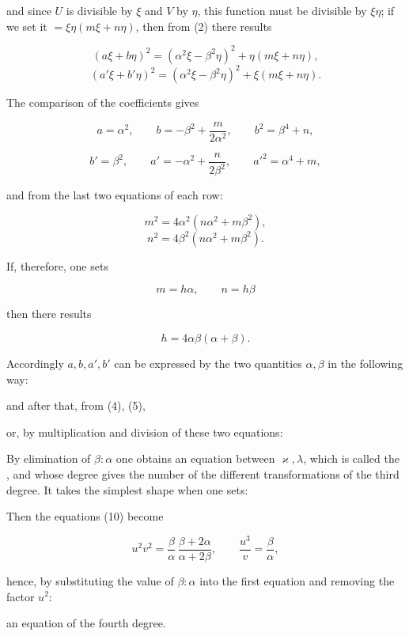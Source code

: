 and since $U$ is divisible by $\xi$ and $V$ by $\eta$, this function must be
divisible by $\xi\eta$; if we set it $=\xi\eta(m\xi+n\eta)$, then from (2)
there results

\[
(a\xi+b\eta)^2=(\alpha^2\xi-\beta^2\eta)^2+\eta(m\xi+n\eta),
\]
\[
(a'\xi+b'\eta)^2=(\alpha^2\xi-\beta^2\eta)^2+\xi(m\xi+n\eta).
\]

The comparison of the coefficients gives

\[
a=\alpha^2, \qquad b=-\beta^2+\frac{m}{2\alpha^2}, \qquad b^2=\beta^4+n,
\]

\[
b'=\beta^2, \qquad a'=-\alpha^2+\frac{n}{2\beta^2}, \qquad a'^2=\alpha^4+m,
\]

and from the last two equations of each row:

\[
m^2=4\alpha^2(n\alpha^2+m\beta^2),
\]
\[
n^2=4\beta^2(n\alpha^2+m\beta^2).
\]

If, therefore, one sets

\[
m=h\alpha, \qquad n=h\beta
\]

then there results

\[
h=4\alpha\beta(\alpha+\beta).
\]

Accordingly $a,b,a',b'$ can be expressed by the two quantities $\alpha,\beta$
in the following way:


and after that, from (4), (5),


or, by multiplication and division of these two equations:


By elimination of $\beta:\alpha$ one obtains an equation between
$\varkappa,\lambda$, which is called the , and whose degree gives
the number of the different transformations of the third degree. It takes the
simplest shape when one sets:


Then the equations (10) become

\[
u^2v^2=\frac{\beta}{\alpha}\,\frac{\beta+2\alpha}{\alpha+2\beta}, \qquad
\frac{u^3}{v}=\frac{\beta}{\alpha},
\]

hence, by substituting the value of $\beta:\alpha$ into the first equation and
removing the factor $u^2$:


an equation of the fourth degree.
